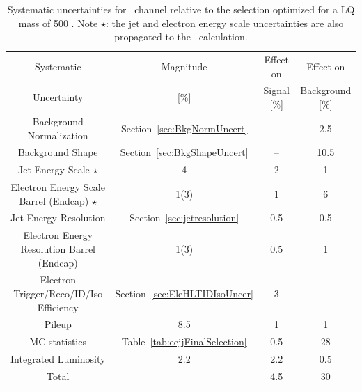 \begin{table}
  \begin{center}
    \small
    \begin{tabular}{c|c|c|c} 
      Systematic  & Magnitude  & Effect on  & Effect on \\
      Uncertainty &     [\%]           & Signal [\%]    & Background [\%] \\                   
      \hline\hline
      Background Normalization &  Section~\ref{sec:BkgNormUncert} & -- &  2.5 \\
      Background Shape & Section~\ref{sec:BkgShapeUncert} & -- &  10.5 \\
      Jet Energy Scale $\star$ & 4 & 2 & 1 \\
      Electron Energy Scale Barrel (Endcap) $\star$ & 1(3) & 1 & 6 \\
      Jet Energy Resolution & Section~\ref{sec:jetresolution} & 0.5 & 0.5 \\
      Electron Energy Resolution Barrel (Endcap) & 1(3) & 0.5 & 1 \\
      Electron Trigger/Reco/ID/Iso Efficiency & Section~\ref{sec:EleHLTIDIsoUncer} & 3 & -- \\
      Pileup   & 8.5 & 1 & 1 \\  
      MC statistics & Table~\ref{tab:eejjFinalSelection} & 0.5 & 28 \\
      Integrated Luminosity & 2.2 & 2.2 & 0.5 \\
      \hline
      Total & & 4.5 & 30 \\
    \end{tabular}
    \caption{Systematic uncertainties for \eejj~channel relative to the selection optimized for a LQ mass of 500 \GeV. 
      Note $\star$: the jet and electron energy scale uncertainties are also propagated to the \MET~calculation.}
    \label{tab:eejjSystematics}    
  \end{center}
\end{table}

